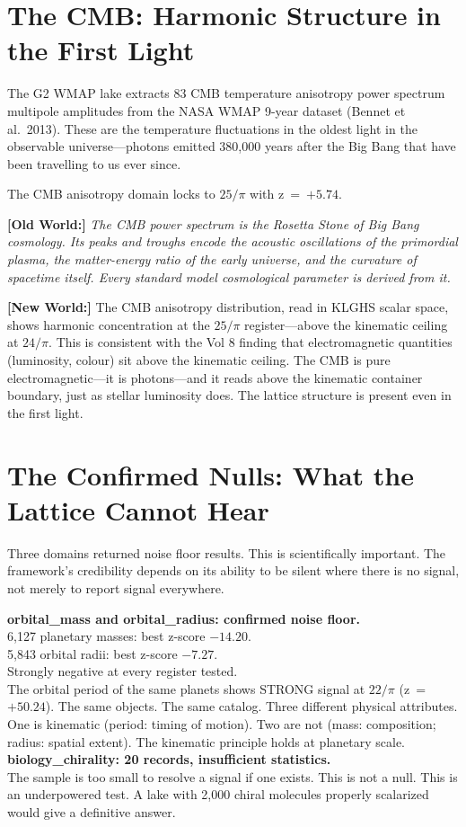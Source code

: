 \documentclass[11pt, letterpaper, openany]{book}
\newcommand{\oldworld}[1]{\noindent\textbf{\color{goldseal}[Old World:]} \textit{#1}\medskip}
\newcommand{\newworld}[1]{\noindent\textbf{\color{kishblue}[New World:]} #1\medskip}
\begin{document}
\section{The CMB: Harmonic Structure in the First Light}

The G2 WMAP lake extracts 83 CMB temperature anisotropy power spectrum multipole
amplitudes from the NASA WMAP 9-year dataset (Bennet et al.\ 2013). These are the
temperature fluctuations in the oldest light in the observable universe---photons
emitted 380,000 years after the Big Bang that have been travelling to us ever since.

The CMB anisotropy domain locks to $25/\pi$ with z~=~$+5.74$.

\oldworld{The CMB power spectrum is the Rosetta Stone of Big Bang cosmology.
Its peaks and troughs encode the acoustic oscillations of the primordial plasma,
the matter-energy ratio of the early universe, and the curvature of spacetime
itself. Every standard model cosmological parameter is derived from it.}

\newworld{The CMB anisotropy distribution, read in KLGHS scalar space, shows
harmonic concentration at the $25/\pi$ register---above the kinematic ceiling at
$24/\pi$. This is consistent with the Vol 8 finding that electromagnetic quantities
(luminosity, colour) sit above the kinematic ceiling. The CMB is pure
electromagnetic---it is photons---and it reads above the kinematic container
boundary, just as stellar luminosity does. The lattice structure is present
even in the first light.}

\section{The Confirmed Nulls: What the Lattice Cannot Hear}

Three domains returned noise floor results. This is scientifically important.
The framework's credibility depends on its ability to be silent where there is
no signal, not merely to report signal everywhere.

\begin{nullbox}
\textbf{orbital\_mass and orbital\_radius: confirmed noise floor.}\\[0.5em]
6,127 planetary masses: best z-score $-14.20$.\\
5,843 orbital radii: best z-score $-7.27$.\\
Strongly negative at every register tested.\\[0.5em]
The orbital period of the same planets shows STRONG signal at $22/\pi$
(z~=~$+50.24$). The same objects. The same catalog. Three different physical
attributes. One is kinematic (period: timing of motion). Two are not (mass:
composition; radius: spatial extent). The kinematic principle holds at
planetary scale.\\[0.5em]
\textbf{biology\_chirality: 20 records, insufficient statistics.}\\
The sample is too small to resolve a signal if one exists. This is not a null.
This is an underpowered test. A lake with 2,000 chiral molecules properly
scalarized would give a definitive answer.
\end{nullbox}
\end{document}
